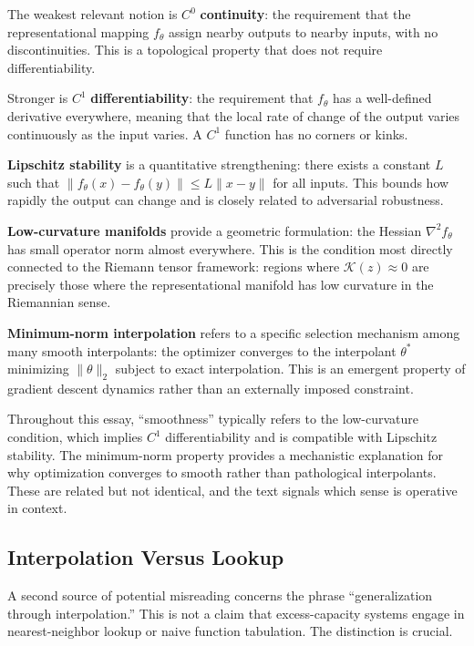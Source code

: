 \documentclass[12pt,a4paper]{article}
\begin{document}
The weakest relevant notion is $C^0$ \textbf{continuity}: the requirement that the representational mapping $f_\theta$ assign nearby outputs to nearby inputs, with no discontinuities. This is a topological property that does not require differentiability.

Stronger is $C^1$ \textbf{differentiability}: the requirement that $f_\theta$ has a well-defined derivative everywhere, meaning that the local rate of change of the output varies continuously as the input varies. A $C^1$ function has no corners or kinks.

\textbf{Lipschitz stability} is a quantitative strengthening: there exists a constant $L$ such that $\|f_\theta(x) - f_\theta(y)\| \leq L\|x - y\|$ for all inputs. This bounds how rapidly the output can change and is closely related to adversarial robustness.

\textbf{Low-curvature manifolds} provide a geometric formulation: the Hessian $\nabla^2 f_\theta$ has small operator norm almost everywhere. This is the condition most directly connected to the Riemann tensor framework: regions where $\mathcal{K}(z) \approx 0$ are precisely those where the representational manifold has low curvature in the Riemannian sense.

\textbf{Minimum-norm interpolation} refers to a specific selection mechanism among many smooth interpolants: the optimizer converges to the interpolant $\theta^*$ minimizing $\|\theta\|_2$ subject to exact interpolation. This is an emergent property of gradient descent dynamics rather than an externally imposed constraint.

Throughout this essay, ``smoothness'' typically refers to the low-curvature condition, which implies $C^1$ differentiability and is compatible with Lipschitz stability. The minimum-norm property provides a mechanistic explanation for why optimization converges to smooth rather than pathological interpolants. These are related but not identical, and the text signals which sense is operative in context.

\subsection{Interpolation Versus Lookup}

A second source of potential misreading concerns the phrase ``generalization through interpolation.'' This is not a claim that excess-capacity systems engage in nearest-neighbor lookup or naive function tabulation. The distinction is crucial.
\end{document}
